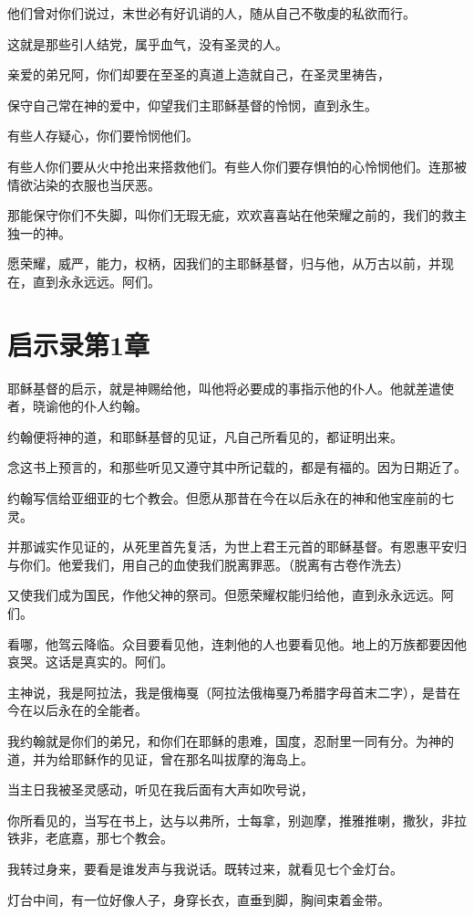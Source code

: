 \documentclass[12pt,oneside]{book}
\begin{document}
他们曾对你们说过，末世必有好讥诮的人，随从自己不敬虔的私欲而行。

这就是那些引人结党，属乎血气，没有圣灵的人。

亲爱的弟兄阿，你们却要在至圣的真道上造就自己，在圣灵里祷告，

保守自己常在神的爱中，仰望我们主耶稣基督的怜悯，直到永生。

有些人存疑心，你们要怜悯他们。

有些人你们要从火中抢出来搭救他们。有些人你们要存惧怕的心怜悯他们。连那被情欲沾染的衣服也当厌恶。

那能保守你们不失脚，叫你们无瑕无疵，欢欢喜喜站在他荣耀之前的，我们的救主独一的神。

愿荣耀，威严，能力，权柄，因我们的主耶稣基督，归与他，从万古以前，并现在，直到永永远远。阿们。

\chapter{启示录第1章}
耶稣基督的启示，就是神赐给他，叫他将必要成的事指示他的仆人。他就差遣使者，晓谕他的仆人约翰。

约翰便将神的道，和耶稣基督的见证，凡自己所看见的，都证明出来。

念这书上预言的，和那些听见又遵守其中所记载的，都是有福的。因为日期近了。

约翰写信给亚细亚的七个教会。但愿从那昔在今在以后永在的神和他宝座前的七灵。

并那诚实作见证的，从死里首先复活，为世上君王元首的耶稣基督。有恩惠平安归与你们。他爱我们，用自己的血使我们脱离罪恶。（脱离有古卷作洗去）

又使我们成为国民，作他父神的祭司。但愿荣耀权能归给他，直到永永远远。阿们。

看哪，他驾云降临。众目要看见他，连刺他的人也要看见他。地上的万族都要因他哀哭。这话是真实的。阿们。

主神说，我是阿拉法，我是俄梅戛（阿拉法俄梅戛乃希腊字母首末二字），是昔在今在以后永在的全能者。

我约翰就是你们的弟兄，和你们在耶稣的患难，国度，忍耐里一同有分。为神的道，并为给耶稣作的见证，曾在那名叫拔摩的海岛上。

当主日我被圣灵感动，听见在我后面有大声如吹号说，

你所看见的，当写在书上，达与以弗所，士每拿，别迦摩，推雅推喇，撒狄，非拉铁非，老底嘉，那七个教会。

我转过身来，要看是谁发声与我说话。既转过来，就看见七个金灯台。

灯台中间，有一位好像人子，身穿长衣，直垂到脚，胸间束着金带。
\end{document}
